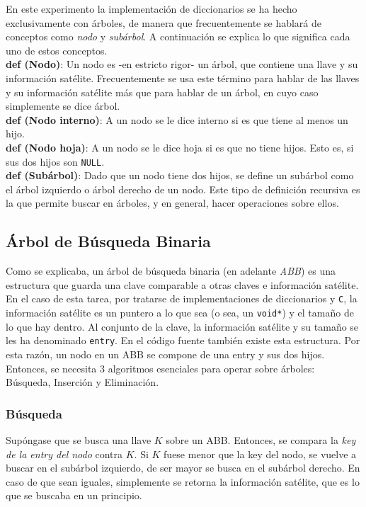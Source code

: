 \documentclass[12pt,letterpaper]{report}
\begin{document}
En este experimento la implementación de diccionarios se ha hecho exclusivamente con árboles, de manera que frecuentemente se hablará de conceptos como \emph{nodo} y \emph{subárbol}. A continuación se explica lo que significa cada uno de estos conceptos.\\

\textbf{def (Nodo)}: Un nodo es -en estricto rigor- un árbol, que contiene una llave y su información satélite. Frecuentemente se usa este término para hablar de las llaves y su información satélite más que para hablar de un árbol, en cuyo caso simplemente se dice árbol.\\

\textbf{def (Nodo interno)}: A un nodo se le dice interno si es que tiene al menos un hijo.\\

\textbf{def (Nodo hoja)}: A un nodo se le dice hoja si es que no tiene hijos. Esto es, si sus dos hijos son \texttt{NULL}.\\

\textbf{def (Subárbol)}: Dado que un nodo tiene dos hijos, se define un subárbol como el árbol izquierdo o árbol derecho de un nodo. Este tipo de definición recursiva es la que permite buscar en árboles, y en general, hacer operaciones sobre ellos.\\


\subsection{Árbol de Búsqueda Binaria}
\label{subsec:marco_abb}
Como se explicaba, un árbol de búsqueda binaria (en adelante \emph{ABB}) es una estructura que guarda una clave comparable a otras claves e información satélite. En el caso de esta tarea, por tratarse de implementaciones de diccionarios y \texttt{C}, la información satélite es un puntero a lo que sea (o sea, un \texttt{void*}) y el tamaño de lo que hay dentro. Al conjunto de la clave, la información satélite y su tamaño se les ha denominado \texttt{entry}. En el código fuente también existe esta estructura. Por esta razón, un nodo en un ABB se compone de una entry y sus dos hijos.\\

Entonces, se necesita 3 algoritmos esenciales para operar sobre árboles: Búsqueda, Inserción y Eliminación.

\subsubsection{Búsqueda}
Supóngase que se busca una llave $K$ sobre un ABB. Entonces, se compara la \emph{key de la entry del nodo} contra $K$. Si $K$ fuese menor que la key del nodo, se vuelve a buscar en el subárbol izquierdo, de ser mayor se busca en el subárbol derecho. En caso de que sean iguales, simplemente se retorna la información satélite, que es lo que se buscaba en un principio.\\
\end{document}

